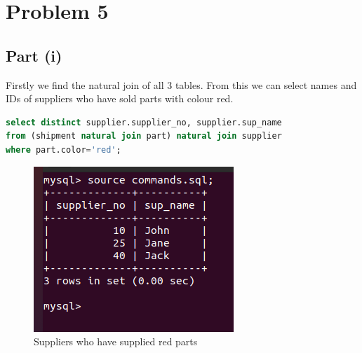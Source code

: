 \documentclass{article}
\begin{document}
\section{Problem 5}

\subsection{Part (i)}
Firstly we find the natural join of all 3 tables. From this we can select 
names and IDs of suppliers who have sold parts with colour red.
\begin{lstlisting}[language=sql]
select distinct supplier.supplier_no, supplier.sup_name
from (shipment natural join part) natural join supplier
where part.color='red';
\end{lstlisting}
\begin{figure}[!ht]
  \begin{center}
  \includegraphics[scale=1]{red_supply.png}
  \caption{Suppliers who have supplied red parts}
  \end{center}
\end{figure}
\end{document}
